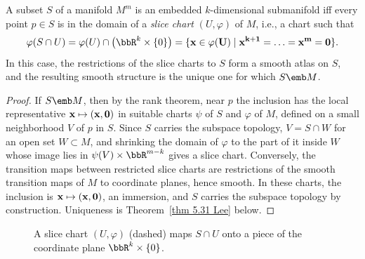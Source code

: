 \begin{prop}\label{prop slice charts}
    A subset $S$ of a manifold $M^m$ is an embedded $k$-dimensional submanifold iff every point $p\in S$ is in the domain of a \emph{slice chart} $(U,\varphi)$ of $M$, i.e., a chart such that
    \[\varphi(S\cap U)=\varphi(U)\cap\big(\bbR^k\times\{0\}\big)=\{\bf{x}\in\varphi(U)\mid x^{k+1}=\ldots=x^m=0\}.\]
    In this case, the restrictions of the slice charts to $S$ form a smooth atlas on $S$, and the resulting smooth structure is the unique one for which $S\emb M$.
\end{prop}
\begin{proof}
    If $S\emb M$, then by the rank theorem, near $p$ the inclusion has the local representative $\bf{x}\mapsto(\bf{x},0)$ in suitable charts $\psi$ of $S$ and $\varphi$ of $M$, defined on a small neighborhood $V$ of $p$ in $S$. Since $S$ carries the subspace topology, $V=S\cap W$ for an open set $W\subset M$, and shrinking the domain of $\varphi$ to the part of it inside $W$ whose image lies in $\psi(V)\times\bbR^{m-k}$ gives a slice chart. Conversely, the transition maps between restricted slice charts are restrictions of the smooth transition maps of $M$ to coordinate planes, hence smooth. In these charts, the inclusion is $\bf{x}\mapsto(\bf{x},0)$, an immersion, and $S$ carries the subspace topology by construction. Uniqueness is Theorem~\ref{thm 5.31 Lee} below.
\end{proof}

\begin{figure}[tp]
    \centering
    \caption{A slice chart $(U,\varphi)$ (dashed) maps $S\cap U$ onto a piece of the coordinate plane $\bbR^k\times\{0\}$.}
    \label{fig slice chart}
\end{figure}

